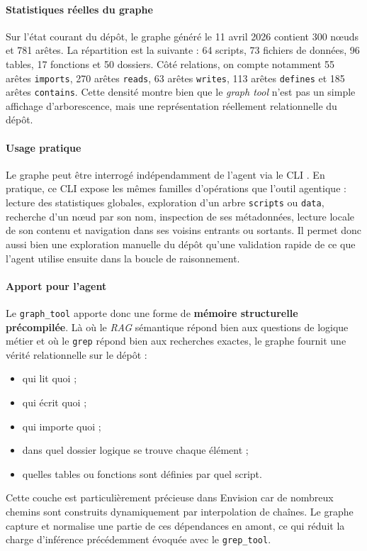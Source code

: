 \paragraph{Statistiques réelles du graphe}
Sur l'état courant du dépôt, le graphe généré le 11 avril 2026 contient 300 nœuds et 781 arêtes. La répartition est la suivante : 64 scripts, 73 fichiers de données, 96 tables, 17 fonctions et 50 dossiers. Côté relations, on compte notamment 55 arêtes \texttt{imports}, 270 arêtes \texttt{reads}, 63 arêtes \texttt{writes}, 113 arêtes \texttt{defines} et 185 arêtes \texttt{contains}. Cette densité montre bien que le \textit{graph tool} n'est pas un simple affichage d'arborescence, mais une représentation réellement relationnelle du dépôt.

\paragraph{Usage pratique}
Le graphe peut être interrogé indépendamment de l'agent via le CLI . En pratique, ce CLI expose les mêmes familles d'opérations que l'outil agentique : lecture des statistiques globales, exploration d'un arbre \texttt{scripts} ou \texttt{data}, recherche d'un nœud par son nom, inspection de ses métadonnées, lecture locale de son contenu et navigation dans ses voisins entrants ou sortants. Il permet donc aussi bien une exploration manuelle du dépôt qu'une validation rapide de ce que l'agent utilise ensuite dans la boucle de raisonnement.

\paragraph{Apport pour l'agent}
Le \texttt{graph\_tool} apporte donc une forme de \textbf{mémoire structurelle précompilée}. Là où le \textit{RAG} sémantique répond bien aux questions de logique métier et où le \texttt{grep} répond bien aux recherches exactes, le graphe fournit une vérité relationnelle sur le dépôt :
\begin{itemize}
    \item qui lit quoi ;
    \item qui écrit quoi ;
    \item qui importe quoi ;
    \item dans quel dossier logique se trouve chaque élément ;
    \item quelles tables ou fonctions sont définies par quel script.
\end{itemize}

Cette couche est particulièrement précieuse dans Envision car de nombreux chemins sont construits dynamiquement par interpolation de chaînes. Le graphe capture et normalise une partie de ces dépendances en amont, ce qui réduit la charge d'inférence précédemment évoquée avec le \texttt{grep\_tool}.